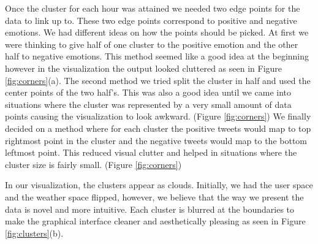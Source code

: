 \documentclass[journal]{vgtc}                %
\begin{document}
Once the cluster for each hour was attained we needed two edge points for the data to link up to. These two edge points correspond to positive and negative emotions. We had different ideas on how the points should be picked. At first we were thinking to give half of one cluster to the positive emotion and the other half to negative emotions. This method seemed like a good idea at the beginning however in the visualization the output looked cluttered as seen in Figure \ref{fig:corners}(a). The second method we tried split the cluster in half and used the center points of the two half's. This was also a good idea until we came into situations where the cluster was represented by a very small amount of data points causing the visualization to look awkward. (Figure \ref{fig:corners}) We finally decided on a method where for each cluster the positive tweets would map to top rightmost point in the cluster and the negative tweets would map to the bottom leftmost point. This reduced visual clutter and helped in situations where the cluster size is fairly small. (Figure \ref{fig:corners})

In our visualization, the clusters appear as clouds. Initially, we had the user space and the weather space flipped, however, we believe that the way we present the data is novel and more intuitive. Each cluster is blurred at the boundaries to make the graphical interface cleaner and aesthetically pleasing as seen in Figure \ref{fig:clusters}(b).
\end{document}
